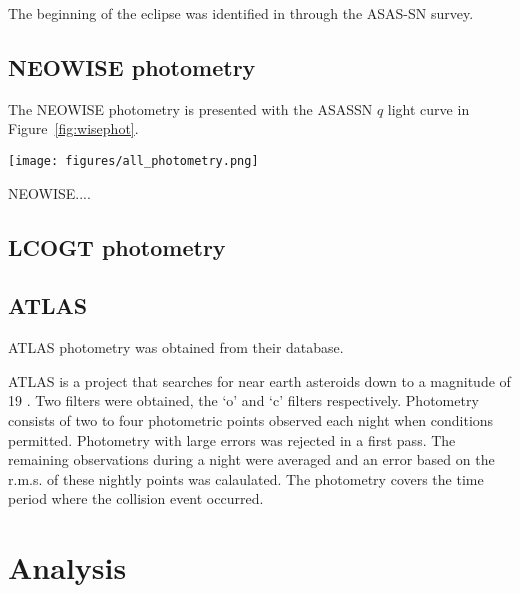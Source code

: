 \documentclass{aa}
\begin{document}
The beginning of the eclipse was identified in \citet{RizzoSmith21} through the ASAS-SN survey.
%

\subsection{NEOWISE photometry}

The NEOWISE photometry is presented with the ASASSN $q$ light curve in Figure~\ref{fig:wisephot}.

\begin{figure*}
   \begin{centering}
   \texttt{[image: figures/all\_photometry.png]}
      \caption{NEOWISE $W1$ and $W2$ photometry of the star, with the WISE color in the lowest panel.
      The $NEOWISE$ color changes from colourless to very red, which fades back towards colourless over $\sim 500$ days.
              }
              \label{fig:wisephot}
              \end{centering}
       \end{figure*}




NEOWISE....



\subsection{LCOGT photometry}

\subsection{ATLAS}

ATLAS photometry was obtained from their database.



ATLAS is a project that searches for near earth asteroids down to a magnitude of 19 
\citep{Tonry18}.
%
Two filters were obtained, the `o' and `c' filters respectively.
%
Photometry consists of two to four photometric points observed each night when conditions permitted.
%
Photometry with large errors was rejected in a first pass.
%
The remaining observations during a night were averaged and an error based on the r.m.s. of these nightly points was calaulated.
%
The photometry covers the time period where the collision event occurred. 


\section{Analysis}\label{sec:dustcloud}
\end{document}
